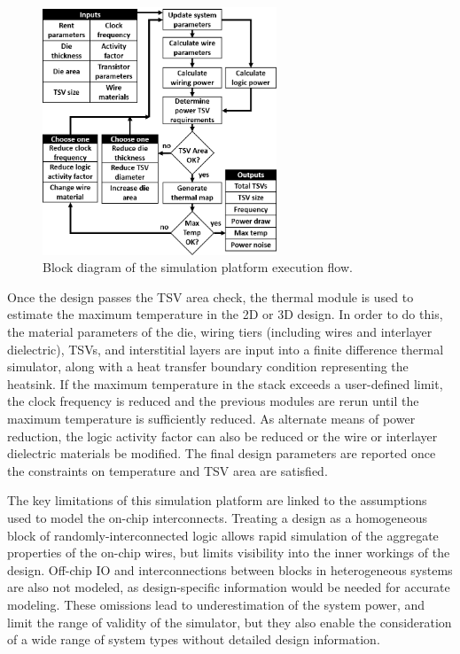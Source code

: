 \documentclass[journal,twoside]{IEEEtran}
\newcommand{\changed}[1]{\textcolor{red}{#1}}
\newcommand{\rechanged}[1]{\textcolor{red}{#1}}
\renewcommand{\rechanged}[1]{#1} %
\renewcommand{\changed}[1]{#1} %
\begin{document}
\begin{figure}[tb]
	\centering
	\includegraphics[width=2.75in]{Figures/vp-flowchart-4.png}
	\caption{Block diagram of the simulation platform execution flow.}
	\label{f-vp-flowchart}
\end{figure}

\changed{Once the design passes the TSV area check, the thermal module is used to estimate the maximum temperature in the 2D
or 3D design. In order to do this, the material parameters of the die, wiring tiers (including wires and interlayer
dielectric), TSVs, and interstitial layers are input into a finite difference thermal simulator, along with a heat transfer
boundary condition representing the heatsink. If the maximum temperature in the stack
exceeds a user-defined limit, the clock frequency is reduced and the previous modules are rerun until
the maximum temperature is sufficiently reduced. As alternate means of power reduction, the logic activity factor can also be reduced
or the wire or interlayer dielectric materials be modified.
The final design parameters are reported once the constraints on temperature and TSV area are satisfied. }

\rechanged{
The key limitations of this simulation platform are linked to the assumptions used to model the on-chip interconnects. %
Treating a design as a homogeneous block of randomly-interconnected logic allows
rapid simulation of the aggregate properties of the on-chip wires,
but limits visibility into the inner workings of the design.
Off-chip IO and interconnections between blocks in heterogeneous systems are also not modeled, as design-specific
information would be needed for accurate modeling. 
These omissions lead to underestimation of the system power, and limit the range of validity of
the simulator, but they also enable the consideration
of a wide range of system types without detailed design information.}
\end{document}
